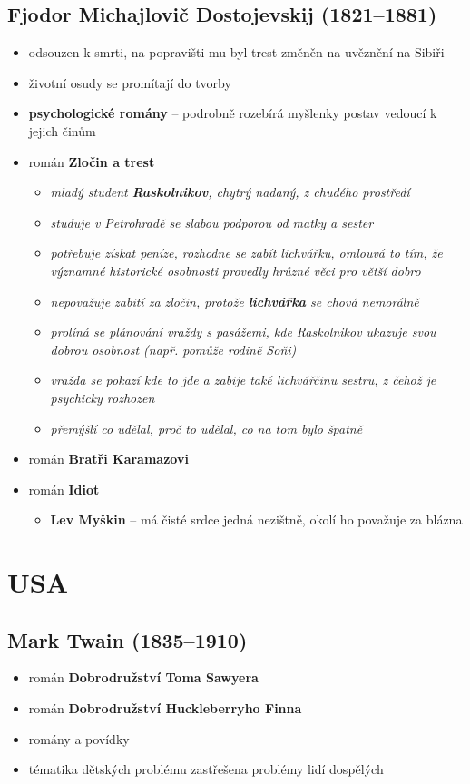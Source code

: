 \subsection{Fjodor Michajlovič Dostojevskij (1821--1881)}
\begin{itemize}
\item odsouzen k smrti, na popravišti mu byl trest změněn na uvěznění na Sibiři
\item životní osudy se promítají do tvorby
\item \textbf{psychologické romány} -- podrobně rozebírá myšlenky postav vedoucí k jejich činům
\item román \textbf{Zločin a trest}
	\begin{itemize}
	\item \textit{mladý student \textbf{Raskolnikov}, chytrý nadaný, z chudého prostředí }
	\item \textit{studuje v Petrohradě se slabou podporou od matky a sester}
	\item \textit{potřebuje získat peníze, rozhodne se zabít lichvářku, omlouvá to tím, že významné historické osobnosti provedly hrůzné věci pro větší dobro}
	\item \textit{nepovažuje zabití za zločin, protože \textbf{lichvářka} se chová nemorálně}
	\item \textit{prolíná se plánování vraždy s pasážemi, kde Raskolnikov ukazuje svou dobrou osobnost (např. pomůže rodině Soňi)}
	\item \textit{vražda se pokazí kde to jde a zabije také lichvářčinu sestru, z čehož je psychicky rozhozen}
	\item \textit{přemýšlí co udělal, proč to udělal, co na tom bylo špatně}
	\end{itemize}
\item román \textbf{Bratři Karamazovi}
\item román \textbf{Idiot}
	\begin{itemize}
	\item \textbf{Lev Myškin} -- má čisté srdce \ra jedná nezištně, okolí ho považuje za blázna
	\end{itemize}
\end{itemize}

\section{USA}
\subsection{Mark Twain (1835--1910)}
\begin{itemize}
\item román \textbf{Dobrodružství Toma Sawyera}
\item román \textbf{Dobrodružství Huckleberryho Finna}
\item romány a povídky
\item tématika dětských problému zastřešena problémy lidí dospělých
\end{itemize}


